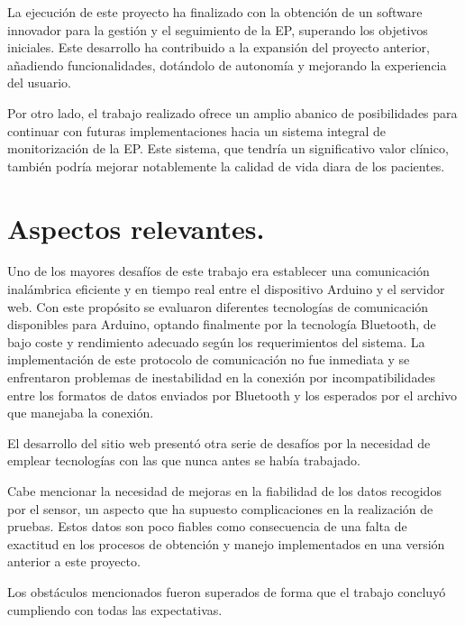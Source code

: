 
La ejecución de este proyecto ha finalizado con la obtención de un software innovador para la gestión y el seguimiento de la EP, superando los objetivos iniciales. Este desarrollo ha contribuido a la expansión del proyecto anterior, añadiendo funcionalidades, dotándolo de autonomía y mejorando la experiencia del usuario. 

Por otro lado, el trabajo realizado ofrece un amplio abanico de posibilidades para continuar con futuras implementaciones hacia un sistema integral de monitorización de la EP. Este sistema, que tendría un significativo valor clínico, también podría mejorar notablemente la calidad de vida diara de los pacientes.

\section{Aspectos relevantes.}

Uno de los mayores desafíos de este trabajo era establecer una comunicación inalámbrica eficiente y en tiempo real entre el dispositivo Arduino y el servidor web. Con este propósito se evaluaron diferentes tecnologías de comunicación disponibles para Arduino, optando finalmente por la tecnología Bluetooth, de bajo coste y rendimiento adecuado según los requerimientos del sistema. La implementación de este protocolo de comunicación no fue inmediata y se enfrentaron problemas de inestabilidad en la conexión por incompatibilidades entre los formatos de datos enviados por Bluetooth y los esperados por el archivo que manejaba la conexión.

El desarrollo del sitio web presentó otra serie de desafíos por la necesidad de emplear tecnologías con las que nunca antes se había trabajado.

Cabe mencionar la necesidad de mejoras en la fiabilidad de los datos recogidos por el sensor, un aspecto que ha supuesto complicaciones en la realización de pruebas. Estos datos son poco fiables como consecuencia de una falta de exactitud en los procesos de obtención y manejo implementados en una versión anterior a este proyecto.

Los obstáculos mencionados fueron superados de forma que el trabajo concluyó cumpliendo con todas las expectativas.



